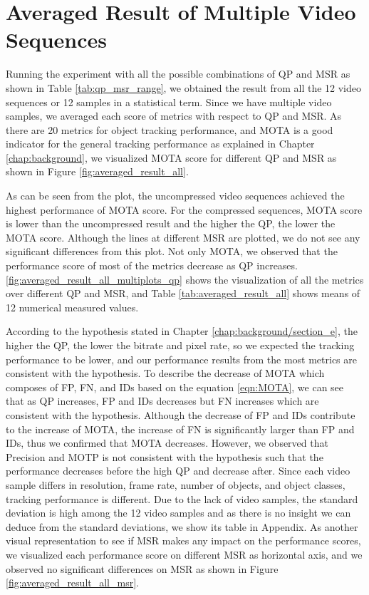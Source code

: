 \section{Averaged Result of Multiple Video Sequences}
\label{sec:results/section_a}

Running the experiment with all the possible combinations of QP and MSR as shown in Table \ref{tab:qp_msr_range}, we obtained the result from all the 12 video sequences or 12 samples in a statistical term. Since we have multiple video samples, we averaged each score of metrics with respect to QP and MSR. As there are 20 metrics for object tracking performance, and MOTA is a good indicator for the general tracking performance as explained in Chapter \ref{chap:background}, we visualized MOTA score for different QP and MSR as shown in Figure \ref{fig:averaged_result_all}.

As can be seen from the plot, the uncompressed video sequences achieved the highest performance of MOTA score. For the compressed sequences, MOTA score is lower than the uncompressed result and the higher the QP, the lower the MOTA score. Although the lines at different MSR are plotted, we do not see any significant differences from this plot. Not only MOTA, we observed that the performance score of most of the metrics decrease as QP increases. \ref{fig:averaged_result_all_multiplots_qp} shows the visualization of all the metrics over different QP and MSR, and Table \ref{tab:averaged_result_all} shows means of 12 numerical measured values.


According to the hypothesis stated in Chapter \ref{chap:background/section_e}, the higher the QP, the lower the bitrate and pixel rate, so we expected the tracking performance to be lower, and our performance results from the most metrics are consistent with the hypothesis. To describe the decrease of MOTA which composes of FP, FN, and IDs based on the equation \ref{eqn:MOTA}, we can see that as QP increases, FP and IDs decreases but FN increases which are consistent with the hypothesis. Although the decrease of FP and IDs contribute to the increase of MOTA, the increase of FN is significantly larger than FP and IDs, thus we confirmed that MOTA decreases. However, we observed that Precision and MOTP is not consistent with the hypothesis such that the performance decreases before the high QP and decrease after. Since each video sample differs in resolution, frame rate, number of objects, and object classes, tracking performance is different. Due to the lack of video samples, the standard deviation is high among the 12 video samples and as there is no insight we can deduce from the standard deviations, we show its table in Appendix. As another visual representation to see if MSR makes any impact on the performance scores, we visualized each performance score on different MSR as horizontal axis, and we observed no significant differences on MSR as shown in Figure \ref{fig:averaged_result_all_msr}.
